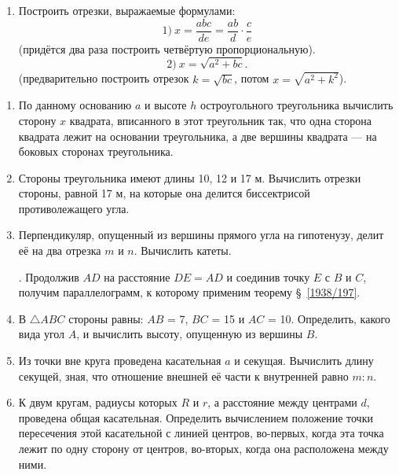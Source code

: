 \documentclass[twoside]{book}
\begin{document}
\begin{enumerate}[resume]
 \item
Построить отрезки, выражаемые формулами: 
\[1)\ x=\frac{abc}{de}=\frac{ab}{d}\cdot \frac{c}{e}\]
(придётся два раза построить четвёртую пропорциональную).
\[2)\ x=\sqrt{a^2+bc}.\]
(предварительно построить отрезок $k=\sqrt{bc}$, потом $x=\sqrt{a^2+k^2}$).

\end{enumerate}

\begin{center}
\end{center}

\begin{enumerate}[resume]

 \item
По данному основанию $a$ и высоте $h$ остроугольного треугольника вычислить сторону $x$ квадрата, вписанного в этот треугольник так, что одна сторона квадрата лежит на основании треугольника, а две вершины квадрата — на боковых сторонах треугольника.

 \item
Стороны треугольника имеют длины 10, 12 и 17 м.
Вычислить отрезки стороны, равной 17 м, на которые она делится биссектрисой противолежащего угла.

 \item
Перпендикуляр, опущенный из вершины прямого угла на гипотенузу, делит её на два отрезка $m$ и $n$.
Вычислить катеты.

\smallskip
{}.
Продолжив $AD$ на расстояние $DE=AD$ и соединив точку $E$ с $B$ и $C$, получим параллелограмм, к которому применим теорему §~\ref{1938/197}.

 \item
В $\triangle ABC$ стороны равны:
$AB$ = 7, $BC$ = 15 и $AC$ = 10.
Определить, какого вида угол $A$, и вычислить высоту, опущенную из вершины $B$.

 \item
Из точки вне круга проведена касательная $a$ и секущая.
Вычислить длину секущей, зная, что отношение внешней её части к внутренней равно $m:n$.

\item
К двум кругам, радиусы которых $R$ и $r$, а расстояние между центрами $d$, проведена общая касательная.
Определить вычислением положение точки пересечения этой касательной с линией центров, во-первых, когда эта точка лежит по одну сторону от центров, во-вторых, когда она расположена между ними.

\end{enumerate}
\end{document}
